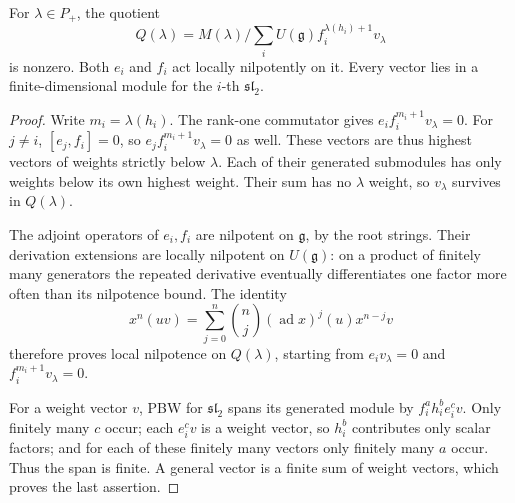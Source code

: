 \begin{lemma}
\label{supp:local-integrability}
For \(\lambda\in P_+\), the quotient
\[
 Q(\lambda)=M(\lambda)/
     \sum_i U(\mathfrak g)f_i^{\lambda(h_i)+1}v_\lambda
\]
is nonzero. Both \(e_i\) and \(f_i\) act locally nilpotently on it.
Every vector lies in a finite-dimensional module for the
\(i\)-th \(\mathfrak{sl}_2\).
\end{lemma}
\begin{proof}
Write \(m_i=\lambda(h_i)\).
The rank-one commutator gives
\(e_i f_i^{m_i+1}v_\lambda=0\).
For \(j\ne i\), \([e_j,f_i]=0\), so
\(e_j f_i^{m_i+1}v_\lambda=0\) as well.
These vectors are thus highest vectors of weights strictly below
\(\lambda\). Each of their generated submodules has only weights
below its own highest weight. Their sum has no \(\lambda\) weight,
so \(v_\lambda\) survives in \(Q(\lambda)\).

The adjoint operators of \(e_i,f_i\) are nilpotent on
\(\mathfrak g\), by the root strings. Their derivation extensions
are locally nilpotent on \(U(\mathfrak g)\): on a product of finitely
many generators the repeated derivative eventually differentiates
one factor more often than its nilpotence bound. The identity
\[
 x^n(uv)=\sum_{j=0}^n\binom nj(\operatorname{ad}x)^j(u)x^{n-j}v
\]
therefore proves local nilpotence on \(Q(\lambda)\), starting from
\(e_iv_\lambda=0\) and \(f_i^{m_i+1}v_\lambda=0\).

For a weight vector \(v\), PBW for \(\mathfrak{sl}_2\) spans its
generated module by \(f_i^a h_i^b e_i^c v\).
Only finitely many \(c\) occur; each \(e_i^cv\) is a weight vector,
so \(h_i^b\) contributes only scalar factors; and for each of these
finitely many vectors only finitely many \(a\) occur. Thus the span
is finite. A general vector is a finite sum of weight vectors,
which proves the last assertion.
\end{proof}

